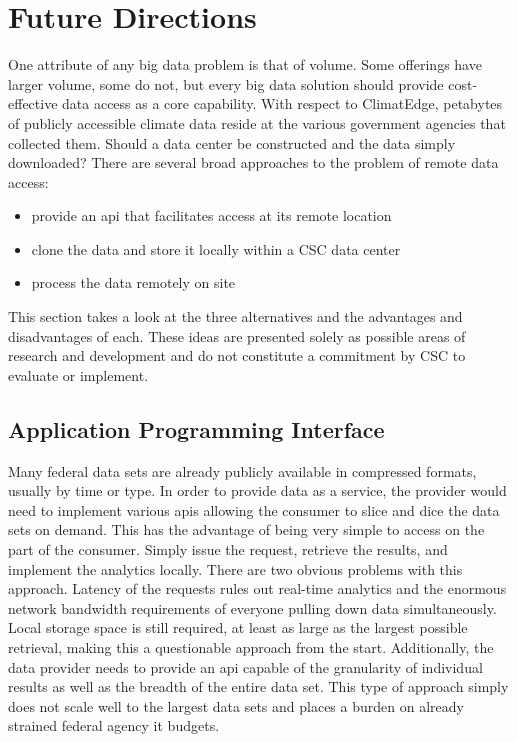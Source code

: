 \section{Future Directions}
One attribute of any big data problem is that of volume. Some offerings have larger volume, some do not, but every big data solution should provide cost-effective data access as a core capability. With respect to ClimatEdge, petabytes of publicly accessible climate data reside at the various government agencies that collected them. Should a data center be constructed and the data simply downloaded? There are several broad approaches to the problem of remote data access:
\begin{itemize}
    \item provide an \gls{api} that facilitates access at its remote location
    \item clone the data and store it locally within a \textsc{CSC} data center
    \item process the data remotely on site
\end{itemize}
This section takes a look at the three alternatives and the advantages and disadvantages of each. These ideas are presented solely as possible areas of research and development and do not constitute a commitment by \textsc{CSC} to evaluate or implement.
\subsection{Application Programming Interface}
Many federal data sets are already publicly available in compressed formats, usually by time or type. In order to provide data as a service, the provider would need to implement various \gls{api}s allowing the consumer to slice and dice the data sets on demand. This has the advantage of being very simple to access on the part of the consumer. Simply issue the request, retrieve the results, and implement the analytics locally. There are two obvious problems with this approach. Latency of the requests rules out real-time analytics and the enormous network bandwidth requirements of everyone pulling down data simultaneously. Local storage space is still required, at least as large as the largest possible retrieval, making this a questionable approach from the start. Additionally, the data provider needs to provide an \gls{api} capable of the granularity of individual results as well as the breadth of the entire data set. This type of approach simply does not scale well to the largest data sets and places a burden on already strained federal agency \gls{it} budgets.
